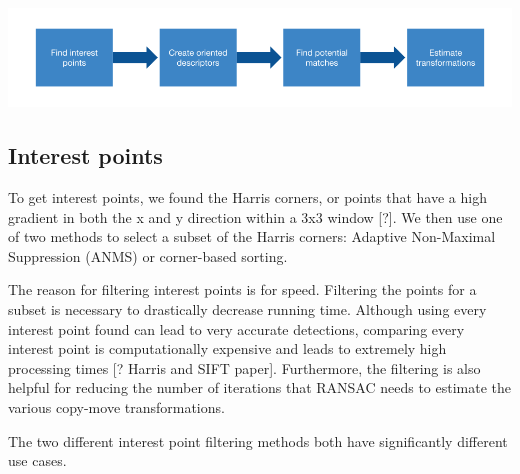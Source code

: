 \documentclass[12pt]{article}
\begin{document}
\includegraphics[width=1.0\linewidth]{./gfx/cm_pipeline.png}

\subsection*{Interest points}
To get interest points, we found the Harris corners, or points that have a high gradient in both the x and y direction within a 3x3 window [?]. We then use one of two methods to select a subset of the Harris corners: Adaptive Non-Maximal Suppression (ANMS) or corner-based sorting. 

The reason for filtering interest points is for speed. Filtering the points for a subset is necessary to drastically decrease running time. Although using every interest point found can lead to very accurate detections, comparing every interest point is computationally expensive and leads to extremely high processing times [? Harris and SIFT paper]. Furthermore, the filtering is also helpful for reducing the number of iterations that RANSAC needs to estimate the various copy-move transformations.

The two different interest point filtering methods both have significantly different use cases.
\end{document}
